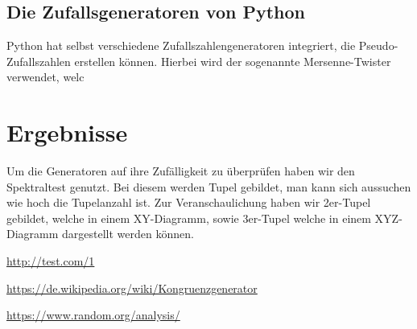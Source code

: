 \documentclass[12pt]{article}
\begin{document}
    \subsection{Die Zufallsgeneratoren von Python}\label{subsec:die-zufallsgeneratoren-von-python}
    Python hat selbst verschiedene Zufallszahlengeneratoren integriert, die Pseudo-Zufallszahlen erstellen können.
    Hierbei wird der sogenannte Mersenne-Twister verwendet, welc







    \section{Ergebnisse}\label{sec:Ergebnisse}
    Um die Generatoren auf ihre Zufälligkeit zu überprüfen haben wir den Spektraltest genutzt.
    Bei diesem werden Tupel gebildet, man kann sich aussuchen wie hoch die Tupelanzahl ist.
    Zur Veranschaulichung haben wir 2er-Tupel gebildet, welche in einem XY-Diagramm, sowie 3er-Tupel welche in einem
    XYZ-Diagramm dargestellt werden können.

    \begin{thebibliography}

        \url{http://test.com/1}

        \url{https://de.wikipedia.org/wiki/Kongruenzgenerator}

        \url{https://www.random.org/analysis/}

    \end{thebibliography}
\end{document}
